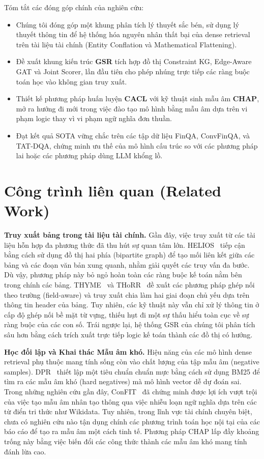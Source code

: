 \documentclass[10pt, a4paper]{article}
\begin{document}
Tóm tắt các đóng góp chính của nghiên cứu:
\begin{itemize}[leftmargin=*]
    \item Chúng tôi đóng góp một khung phân tích lý thuyết sắc bén, sử dụng lý thuyết thông tin để hệ thống hóa nguyên nhân thất bại của dense retrieval trên tài liệu tài chính (Entity Conflation và Mathematical Flattening).
    \item Đề xuất khung kiến trúc \textbf{GSR} tích hợp đồ thị Constraint KG, Edge-Aware GAT và Joint Scorer, lần đầu tiên cho phép nhúng trực tiếp các ràng buộc toán học vào không gian truy xuất.
    \item Thiết kế phương pháp huấn luyện \textbf{CACL} với kỹ thuật sinh mẫu âm \textbf{CHAP}, mở ra hướng đi mới trong việc đào tạo mô hình bằng mẫu âm dựa trên vi phạm logic thay vì vi phạm ngữ nghĩa đơn thuần.
    \item Đạt kết quả SOTA vững chắc trên các tập dữ liệu FinQA, ConvFinQA, và TAT-DQA, chứng minh ưu thế của mô hình cấu trúc so với các phương pháp lai hoặc các phương pháp dùng LLM khổng lồ.
\end{itemize}

\section{Công trình liên quan (Related Work)}

\textbf{Truy xuất bảng trong tài liệu tài chính.} Gần đây, việc truy xuất từ các tài liệu hỗn hợp đa phương thức đã thu hút sự quan tâm lớn. HELIOS~\cite{helios2025} tiếp cận bằng cách sử dụng đồ thị hai phía (bipartite graph) để tạo mối liên kết giữa các bảng và các đoạn văn bản xung quanh, nhằm giải quyết các truy vấn đa bước. Dù vậy, phương pháp này bỏ ngỏ hoàn toàn các ràng buộc kế toán nằm bên trong chính các bảng. THYME~\cite{thyme2025} và THoRR~\cite{thorr2024} đề xuất các phương pháp ghép nối theo trường (field-aware) và truy xuất chia làm hai giai đoạn chủ yếu dựa trên thông tin header của bảng. Tuy nhiên, các kỹ thuật này vẫn chỉ xử lý thông tin ở cấp độ ghép nối bề mặt từ vựng, thiếu hụt đi một sự thấu hiểu toàn cục về sự ràng buộc của các con số. Trái ngược lại, hệ thống GSR của chúng tôi phân tích sâu hơn bằng cách trích xuất trực tiếp logic kế toán thành các đồ thị có hướng.

\textbf{Học đối lập và Khai thác Mẫu âm khó.} Hiệu năng của các mô hình dense retrieval phụ thuộc mang tính sống còn vào chất lượng của tập mẫu âm (negative samples). DPR~\cite{karpukhin2020dpr} thiết lập một tiêu chuẩn chuẩn mực bằng cách sử dụng BM25 để tìm ra các mẫu âm khó (hard negatives) mà mô hình vector dễ dự đoán sai. Trong những nghiên cứu gần đây, ConFIT~\cite{confit2025} đã chứng minh được lợi ích vượt trội của việc tạo mẫu âm nhân tạo thông qua việc nhiễu loạn ngữ nghĩa dựa trên các từ điển tri thức như Wikidata. Tuy nhiên, trong lĩnh vực tài chính chuyên biệt, chưa có nghiên cứu nào tận dụng chính các phương trình toán học nội tại của các báo cáo để tạo ra mẫu âm một cách tinh tế. Phương pháp CHAP lấp đầy khoảng trống này bằng việc biến đổi các công thức thành các mẫu âm khó mang tính đánh lừa cao.
\end{document}
